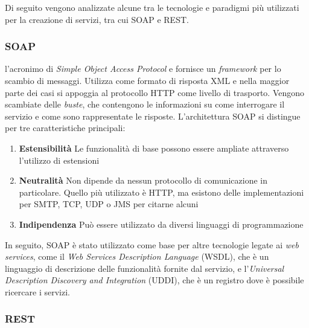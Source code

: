 Di seguito vengono analizzate alcune tra le tecnologie e paradigmi più utilizzati per la creazione di servizi, tra cui SOAP e REST.

\subsubsection{SOAP\label{sec:soap-introduzione}}

\upe l'acronimo di \emph{Simple Object Access Protocol} e fornisce un \emph{framework} per lo scambio di messaggi.  Utilizza come formato di risposta XML e nella maggior parte dei casi si appoggia al protocollo HTTP come livello di trasporto. Vengono scambiate delle \emph{buste}, che contengono le informazioni su come interrogare il servizio e come sono rappresentate le risposte. L'architettura SOAP si distingue per tre caratteristiche principali:

\begin{enumerate}
	\item \textbf{Estensibilità}
	Le funzionalità di base possono essere ampliate attraverso l'u\-ti\-liz\-zo di estensioni
	\item \textbf{Neutralità}
	Non dipende da nessun protocollo di comunicazione in particolare. Quello più utilizzato è HTTP, ma esistono delle implementazioni per SMTP, TCP, UDP o JMS per citarne alcuni
	\item \textbf{Indipendenza}
	Può essere utilizzato da diversi linguaggi di programmazione
\end{enumerate}

In seguito, SOAP è stato utilizzato come base per altre tecnologie legate ai \emph{web services}, come il \emph{Web Services Description Language} (WSDL), che è un linguaggio di descrizione delle funzionalità fornite dal servizio, e l'\emph{Universal Description Discovery and Integration} (UDDI), che è un registro dove è possibile ricercare i servizi.

\subsubsection{REST\label{sec:rest-introduzione}}

